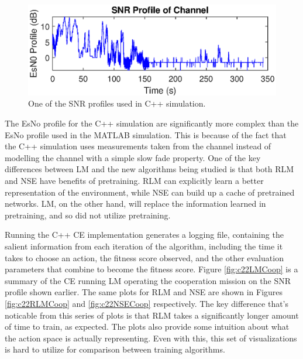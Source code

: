 \begin{figure}[ht]
\centering
\includegraphics[scale=1]{figures/c_sim_results/sim22_SNRProfile.eps}
\caption{One of the SNR profiles used in C++ simulation.}
\label{fig:cSimSNRProfile}
\end{figure}
\par The EsNo profile for the C++ simulation are significantly more complex than the EsNo profile used in the MATLAB simulation. This is because of the fact that the C++ simulation uses measurements taken from the channel instead of modelling the channel with a simple slow fade property. One of the key differences between LM and the new algorithms being studied is that both RLM and NSE have benefits of pretraining. RLM can explicitly learn a better representation of the environment, while NSE can build up a cache of pretrained networks. LM, on the other hand, will replace the information learned in pretraining, and so did not utilize pretraining. 
\par Running the C++ CE implementation generates a logging file, containing the salient information from each iteration of the algorithm, including the time it takes to choose an action, the fitness score observed, and the other evaluation parameters that combine to become the fitness score. Figure \ref{fig:c22LMCoop} is a summary of the CE running LM operating the cooperation mission on the SNR profile shown earlier. The same plots for RLM and NSE are shown in Figures \ref{fig:c22RLMCoop} and \ref{fig:c22NSECoop} respectively. The key difference that's noticable from this series of plots is that RLM takes a significantly longer amount of time to train, as expected. The plots also provide some intuition about what the action space is actually representing. Even with this, this set of visualizations is hard to utilize for comparison between training algorithms.
